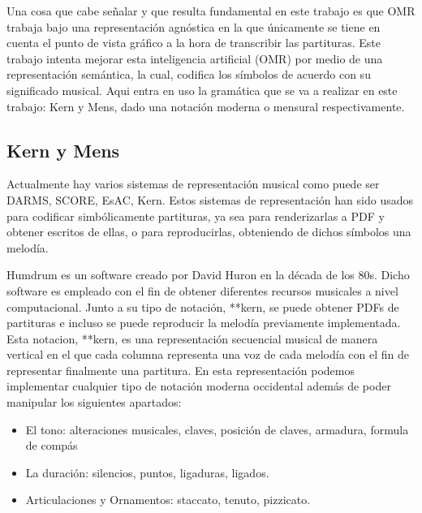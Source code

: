 \documentclass{article}
\begin{document}
Una cosa que cabe señalar y que resulta fundamental en este trabajo es que OMR trabaja bajo una representación agnóstica en la que
únicamente se tiene en cuenta el punto de vista gráfico a la hora de transcribir las partituras. Este trabajo intenta mejorar esta
inteligencia artificial (OMR) por medio de una representación semántica, la cual, codifica los símbolos de acuerdo con su significado
musical. Aqui entra en uso la gramática que se va a realizar en este trabajo: Kern y Mens, dado una notación moderna o mensural respectivamente.

\subsection{Kern y Mens}
 Actualmente hay varios sistemas de representación musical como puede ser DARMS\cite{darms}, SCORE\cite{score},
EsAC\cite{esac}, Kern\cite{kern}. Estos sistemas de representación han sido usados para
codificar simbólicamente partituras, ya sea para renderizarlas a PDF y obtener escritos de ellas, o para reproducirlas,
obteniendo de dichos símbolos una melodía.

Humdrum\cite{humdrum} es un software creado por David Huron en la década de los 80s. Dicho software es empleado con el fin de obtener
diferentes recursos musicales a nivel computacional. Junto a su tipo de notación, **kern, se puede obtener PDFs de partituras
e incluso se puede reproducir la melodía previamente implementada. Esta notacion, **kern, es una representación secuencial musical de manera vertical
en el que cada columna representa una voz de cada melodía
con el fin de representar finalmente una partitura. En esta representación podemos implementar cualquier tipo de notación
moderna occidental además de poder manipular los siguientes apartados:

    \begin{itemize}
        \item El tono: alteraciones musicales, claves, posición de claves, armadura, formula de compás
        \item La duración: silencios, puntos, ligaduras, ligados.
        \item Articulaciones y Ornamentos: staccato, tenuto, pizzicato.
    \end{itemize}
\end{document}
